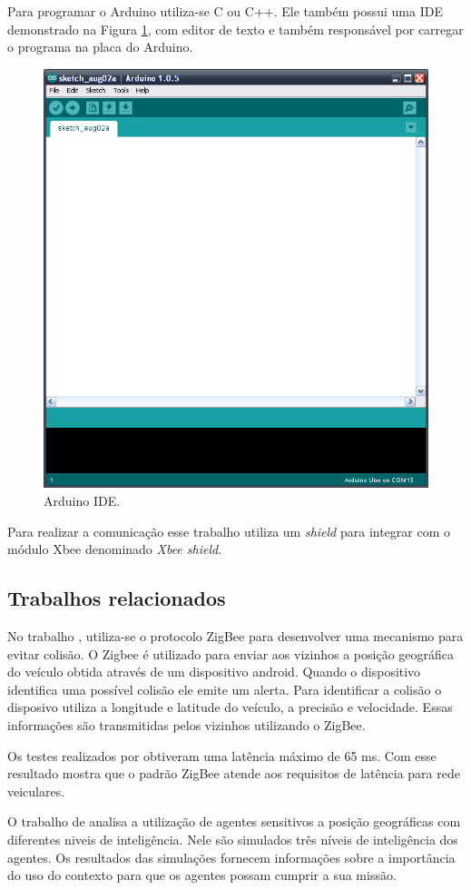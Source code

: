 Para programar o Arduino utiliza-se C ou C++. Ele também possui uma IDE demonstrado na Figura \ref{fig:arduinoIde}, com editor de texto e também responsável por carregar o programa na placa do Arduino.

\begin{figure}[htbp]
	\centering
		\includegraphics[scale=0.2]{referencial/figuras/arduinoIde.png}
	\caption{Arduino IDE.}
	\label{fig:arduinoIde}
\end{figure}

Para realizar a comunicação esse trabalho utiliza um \emph{shield} para integrar com o módulo Xbee denominado \emph{Xbee shield}.  

\subsection{Trabalhos relacionados}

No trabalho \cite{santanaMestrado:2014}, utiliza-se o protocolo ZigBee para desenvolver uma mecanismo para evitar colisão. O Zigbee é utilizado para enviar aos vizinhos a posição geográfica do veículo obtida através de um dispositivo android. Quando o dispositivo identifica uma possível colisão ele emite um alerta. Para identificar a colisão o disposivo utiliza a longitude e latitude do veículo, a precisão e velocidade. Essas informações são transmitidas pelos vizinhos utilizando o ZigBee.

Os testes realizados por \cite{santanaMestrado:2014} obtiveram uma latência máximo de 65 ms. Com esse resultado mostra que o padrão ZigBee atende aos requisitos de latência para rede veiculares.

O trabalho de \cite{Freitas:2011} analisa a utilização de agentes sensitivos a posição geográficas com diferentes niveis de inteligência. Nele são simulados três níveis de inteligência dos agentes. Os resultados das simulações fornecem informações sobre a importância do uso do contexto para que os agentes possam cumprir a sua missão. 